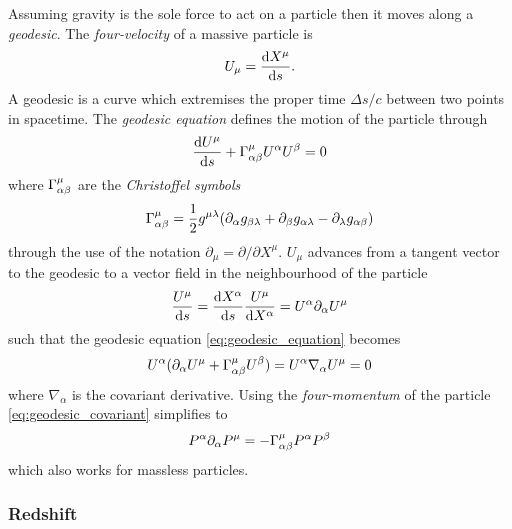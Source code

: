 Assuming gravity is the sole force to act on a particle then it moves along a \emph{geodesic}.
The \emph{four-velocity} of a massive particle is
%
\begin{equation}
	U_{\mu}
    = \dv{X^{\mu}}{s}.
\end{equation}
%
A geodesic is a curve which extremises the proper time \(\Delta s/c\) between two points in spacetime. The \emph{geodesic equation} defines the motion of the particle through
%
\begin{equation}\label{eq:geodesic_equation}
	\dv{U^{\mu}}{s} + \Gamma^{\mu}_{\alpha\beta} U^{\alpha} U^{\beta}
    = 0
\end{equation}
%
where \(\Gamma^{\mu}_{\alpha\beta}\) are the \emph{Christoffel symbols}
%
\begin{equation}
	\Gamma^{\mu}_{\alpha\beta}
    = \frac{1}{2} g^{\mu\lambda}
    (\partial_{\alpha}g_{\beta\lambda}
    + \partial_{\beta}g_{\alpha\lambda}
    - \partial_{\lambda}g_{\alpha\beta})
\end{equation}
%
through the use of the notation \(\partial_{\mu} = \partial/\partial X^{\mu}\).
\(U_{\mu}\) advances from a tangent vector to the geodesic to a vector field in the neighbourhood of the particle
%
\begin{equation}
	\frac{U^{\mu}}{\dd{s}}
    = \dv{X^{\alpha}}{s} \frac{U^{\mu}}{\dd{X^{\alpha}}}
    = U^{\alpha} \partial_{\alpha} U^{\mu}
\end{equation}
%
such that the geodesic equation \cref{eq:geodesic_equation} becomes
%
\begin{equation}\label{eq:geodesic_covariant}
	U^{\alpha} (\partial_{\alpha} U^{\mu} + \Gamma^{\mu}_{\alpha\beta} U^{\beta})
    = U^{\alpha} \nabla_{\alpha} U^{\mu}
    = 0
\end{equation}
%
where \(\nabla_{\alpha}\) is the covariant derivative.
Using the \emph{four-momentum} of the particle \cref{eq:geodesic_covariant} simplifies to
%
\begin{equation}
	P^{\alpha} \partial_{\alpha} P^{\mu}
    = -\Gamma^{\mu}_{\alpha\beta} P^{\alpha} P^{\beta}
\end{equation}
%
which also works for massless particles.

\subsubsection{Redshift}

